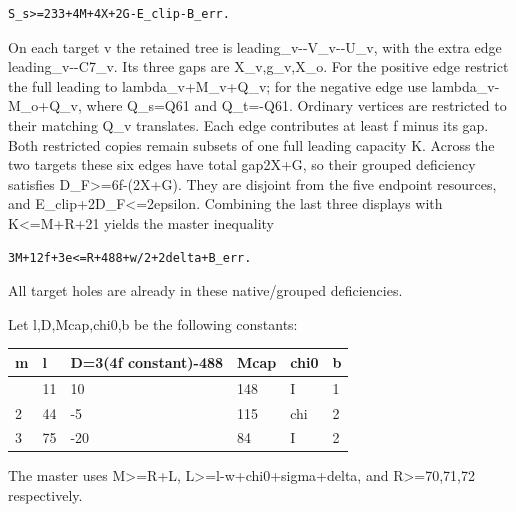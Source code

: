 \documentclass[10pt,a4paper]{article}
\theoremstyle{definition}
\begin{document}
\begin{lstlisting}
S_s>=233+4M+4X+2G-E_clip-B_err.
\end{lstlisting}

On each target v the retained tree is leading\_\allowbreak{}v-\/-V\_\allowbreak{}v-\/-U\_\allowbreak{}v,\allowbreak{} with
the extra edge leading\_\allowbreak{}v-\/-C7\_\allowbreak{}v. Its three gaps are X\_\allowbreak{}v,\allowbreak{}g\_\allowbreak{}v,\allowbreak{}X\_\allowbreak{}o.
For the positive edge restrict the full leading to lambda\_\allowbreak{}v+\allowbreak{}M\_\allowbreak{}v+\allowbreak{}Q\_\allowbreak{}v;
for the negative edge use lambda\_\allowbreak{}v-M\_\allowbreak{}o+\allowbreak{}Q\_\allowbreak{}v,\allowbreak{} where Q\_\allowbreak{}s=\allowbreak{}Q61 and
Q\_\allowbreak{}t=\allowbreak{}-Q61. Ordinary vertices are restricted to their matching Q\_\allowbreak{}v
translates. Each edge contributes at least f minus its gap. Both
restricted copies remain subsets of one full leading capacity K. Across
the two targets these six edges have total gap2X+\allowbreak{}G,\allowbreak{} so their grouped
deficiency satisfies D\_\allowbreak{}F\textgreater=\allowbreak{}6f-(2X+\allowbreak{}G). They are disjoint from
the five endpoint resources,\allowbreak{} and E\_\allowbreak{}clip+\allowbreak{}2D\_\allowbreak{}F\textless=\allowbreak{}2epsilon.
Combining the last three displays with K\textless=\allowbreak{}M+\allowbreak{}R+\allowbreak{}21 yields the
master inequality

\begin{lstlisting}
3M+12f+3e<=R+488+w/2+2delta+B_err.
\end{lstlisting}

All target holes are already in these native/grouped deficiencies.

Let l,\allowbreak{}D,\allowbreak{}Mcap,\allowbreak{}chi0,\allowbreak{}b be the following constants:

\begin{longtable}[]{@{}llllll@{}}
\toprule\noalign{}
m & l & D=\allowbreak{}3(4f constant)-488 & Mcap & chi0 & b \\
\midrule\noalign{}
\endhead
\bottomrule\noalign{}
\endlastfoot
1 & 11 & 10 & 148 & I & 1 \\
2 & 44 & -5 & 115 & chi & 2 \\
3 & 75 & -20 & 84 & I & 2 \\
\end{longtable}

The master uses M\textgreater=\allowbreak{}R+\allowbreak{}L,\allowbreak{} L\textgreater=\allowbreak{}l-w+\allowbreak{}chi0+\allowbreak{}sigma+\allowbreak{}delta,\allowbreak{}
and R\textgreater=\allowbreak{}70,\allowbreak{}71,\allowbreak{}72 respectively.
\end{document}
